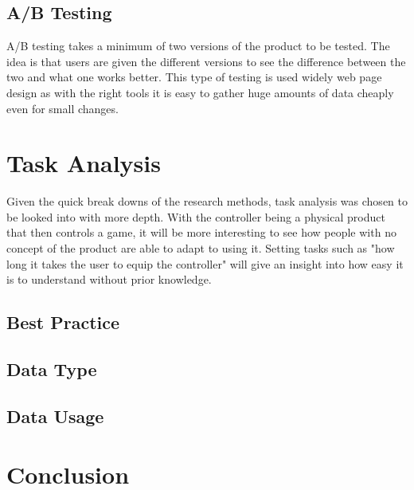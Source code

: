 \documentclass{scrartcl}
\begin{document}
	\subsection{A/B Testing}
		A/B testing takes a minimum of two versions of the product to be tested. The idea is that users are given the different versions to see the difference between the two and what one works better. This type of testing is used widely web page design\citep{azevedo2018b} as with the right tools it is easy to gather huge amounts of data cheaply even for small changes.
		
	\section{Task Analysis}
		Given the quick break downs of the research methods, task analysis was chosen to be looked into with more depth. With the controller being a physical product that then controls a game, it will be more interesting to see how people with no concept of the product are able to adapt to using it. Setting tasks such as "how long it takes the user to equip the controller" will give an insight into how easy it is to understand without prior knowledge.
		
	\subsection{Best Practice}
	
	\subsection{Data Type}
	
	\subsection{Data Usage}

	\section{Conclusion}

	
	
	
	
\end{document}
